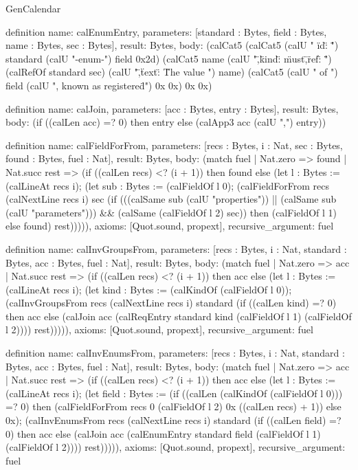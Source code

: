 \begin{lexlean}{GenCalendar}
\begin{semanticmodule}
definition{
  name: calEnumEntry,
  parameters: [standard : Bytes, field : Bytes, name : Bytes, sec : Bytes],
  result: Bytes,
  body: (calCat5 (calCat5 (calU " {\n  \"id\": \"") standard (calU "-enum-") field 0x2d) (calCat5 name (calU "\",\n  \"kind\": \"must\",\n  \"ref\": \"") (calRefOf standard sec) (calU "\",\n  \"text\": \"The value ") name) (calCat5 (calU " of ") field (calU ", known as registered\"\n }") 0x 0x) 0x 0x)
}

definition{
  name: calJoin,
  parameters: [acc : Bytes, entry : Bytes],
  result: Bytes,
  body: (if ((calLen acc) =? 0) then entry else (calApp3 acc (calU ",\n") entry))
}

definition{
  name: calFieldForFrom,
  parameters: [recs : Bytes, i : Nat, sec : Bytes, found : Bytes, fuel : Nat],
  result: Bytes,
  body: (match fuel
    | Nat.zero => found
    | Nat.succ rest => (if ((calLen recs) <? (i + 1)) then found else (let l : Bytes := (calLineAt recs i); (let sub : Bytes := (calFieldOf l 0); (calFieldForFrom recs (calNextLine recs i) sec (if (((calSame sub (calU "properties")) || (calSame sub (calU "parameters"))) && (calSame (calFieldOf l 2) sec)) then (calFieldOf l 1) else found) rest))))),
  axioms: [Quot.sound, propext],
  recursive_argument: fuel
}

definition{
  name: calInvGroupsFrom,
  parameters: [recs : Bytes, i : Nat, standard : Bytes, acc : Bytes, fuel : Nat],
  result: Bytes,
  body: (match fuel
    | Nat.zero => acc
    | Nat.succ rest => (if ((calLen recs) <? (i + 1)) then acc else (let l : Bytes := (calLineAt recs i); (let kind : Bytes := (calKindOf (calFieldOf l 0)); (calInvGroupsFrom recs (calNextLine recs i) standard (if ((calLen kind) =? 0) then acc else (calJoin acc (calReqEntry standard kind (calFieldOf l 1) (calFieldOf l 2)))) rest))))),
  axioms: [Quot.sound, propext],
  recursive_argument: fuel
}

definition{
  name: calInvEnumsFrom,
  parameters: [recs : Bytes, i : Nat, standard : Bytes, acc : Bytes, fuel : Nat],
  result: Bytes,
  body: (match fuel
    | Nat.zero => acc
    | Nat.succ rest => (if ((calLen recs) <? (i + 1)) then acc else (let l : Bytes := (calLineAt recs i); (let field : Bytes := (if ((calLen (calKindOf (calFieldOf l 0))) =? 0) then (calFieldForFrom recs 0 (calFieldOf l 2) 0x ((calLen recs) + 1)) else 0x); (calInvEnumsFrom recs (calNextLine recs i) standard (if ((calLen field) =? 0) then acc else (calJoin acc (calEnumEntry standard field (calFieldOf l 1) (calFieldOf l 2)))) rest))))),
  axioms: [Quot.sound, propext],
  recursive_argument: fuel
}


\end{semanticmodule}
\end{lexlean}
